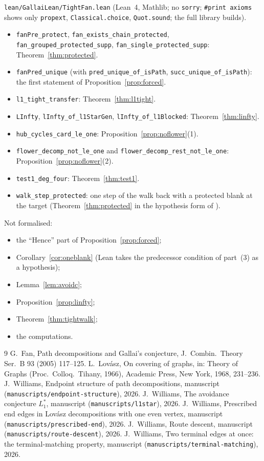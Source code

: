 \documentclass[11pt]{amsart}
\theoremstyle{definition}
\begin{document}
\texttt{lean/GallaiLean/TightFan.lean} (Lean~4, Mathlib; no \texttt{sorry}; \texttt{\#print
axioms} shows only \texttt{propext}, \texttt{Classical.choice}, \texttt{Quot.sound}; the full library
builds).
\begin{itemize}
\item \texttt{fanPre\_protect}, \texttt{fan\_exists\_chain\_protected},
\texttt{fan\_grouped\_protected\_supp}, \texttt{fan\_single\_protected\_supp}:
Theorem~\ref{thm:protected}.
\item \texttt{fanPred\_unique} (with \texttt{pred\_unique\_of\_isPath},
\texttt{succ\_unique\_of\_isPath}): the first statement of Proposition~\ref{prop:forced}.
\item \texttt{l1\_tight\_transfer}: Theorem~\ref{thm:l1tight}.
\item \texttt{LInfty}, \texttt{lInfty\_of\_l1StarGen}, \texttt{lInfty\_of\_l1Blocked}:
Theorem~\ref{thm:linfty}.
\item \texttt{hub\_cycles\_card\_le\_one}: Proposition~\ref{prop:noflower}(1).
\item \texttt{flower\_decomp\_not\_le\_one} and
\texttt{flower\_decomp\_rest\_not\_le\_one}: Proposition~\ref{prop:noflower}(2).
\item \texttt{test1\_deg\_four}: Theorem~\ref{thm:test1}.
\item \texttt{walk\_step\_protected}: one step of the walk back with a protected blank at the
target (Theorem~\ref{thm:protected} in the hypothesis form of \cite[Lemma~3.4]{TM}).
\end{itemize}
Not formalised:
\begin{itemize}
\item the ``Hence'' part of Proposition~\ref{prop:forced};
\item Corollary~\ref{cor:oneblank} (Lean takes the predecessor condition of part~(3) as a
hypothesis);
\item Lemma~\ref{lem:avoidc};
\item Proposition~\ref{prop:linfty};
\item Theorem~\ref{thm:tightwalk};
\item the computations.
\end{itemize}

\begin{thebibliography}{9}
 G.~Fan, Path decompositions and Gallai's conjecture, J.~Combin.\ Theory Ser.~B 93
(2005) 117--125.
 L.~Lov\'asz, On covering of graphs, in: Theory of Graphs (Proc.\ Colloq.\ Tihany,
1966), Academic Press, New York, 1968, 231--236.
 J.~Williams, Endpoint structure of path decompositions, manuscript
(\texttt{manuscripts/endpoint-structure}), 2026.
 J.~Williams, The avoidance conjecture $L_1^*$, manuscript
(\texttt{manuscripts/l1star}), 2026.
 J.~Williams, Prescribed end edges in Lov\'asz decompositions with one even vertex,
manuscript (\texttt{manuscripts/prescribed-end}), 2026.
 J.~Williams, Route descent, manuscript (\texttt{manuscripts/route-descent}), 2026.
 J.~Williams, Two terminal edges at once: the terminal-matching property, manuscript
(\texttt{manuscripts/terminal-matching}), 2026.
\end{thebibliography}
\end{document}
